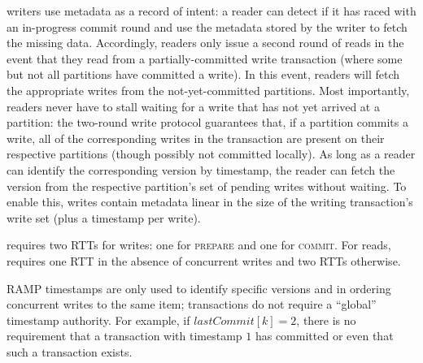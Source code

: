  \rapl writers use metadata as a record of
intent: a reader can detect if it has raced with an in-progress commit
round and use the metadata stored by the writer to fetch the missing
data. Accordingly, \rapl readers only issue a second round of reads in
the event that they read from a partially-committed write transaction
(where some but not all partitions have committed a write). In this
event, readers will fetch the appropriate writes from the
not-yet-committed partitions. Most importantly, \rapl readers never
have to stall waiting for a write that has not yet arrived at a
partition: the two-round \rapl write protocol guarantees that, if a
partition commits a write, all of the corresponding writes in the
transaction are present on their respective partitions (though
possibly not committed locally). As long as a reader can identify the
corresponding version by timestamp, the reader can fetch the version
from the respective partition's set of pending writes without
waiting. To enable this, \rapl writes contain metadata linear in the
size of the writing transaction's write set (plus a timestamp per
write).\vspace{.5em}

\rapl requires two RTTs for writes: one for \textsc{prepare}
and one for \textsc{commit}. For reads, \rapl requires one RTT in the
absence of concurrent writes and two RTTs otherwise.

RAMP timestamps are only used to identify specific versions and in
ordering concurrent writes to the same item; \rapl transactions do not
require a ``global'' timestamp authority. For example, if
$lastCommit[k]=2$, there is no requirement that a transaction
with timestamp $1$ has committed or even that such a transaction
exists.

